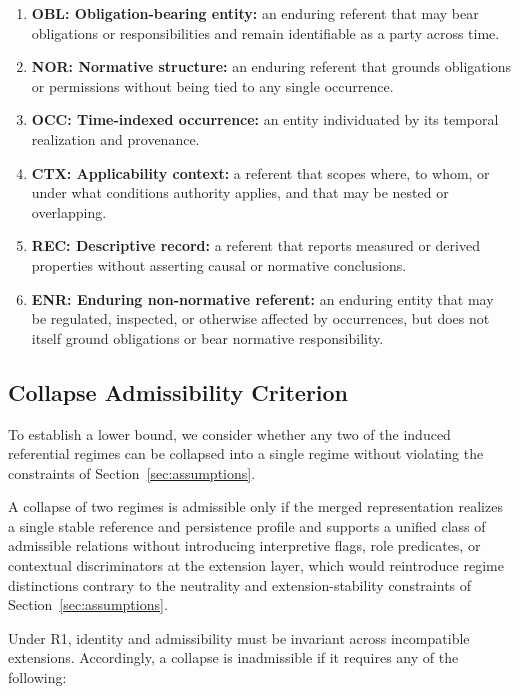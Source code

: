 \begin{enumerate}
\item \textbf{OBL: Obligation-bearing entity:} an enduring referent that may bear
      obligations or responsibilities and remain identifiable as a party across time.
\item \textbf{NOR: Normative structure:} an enduring referent that grounds
      obligations or permissions without being tied to any single occurrence.
\item \textbf{OCC: Time-indexed occurrence:} an entity individuated by its
      temporal realization and provenance.
\item \textbf{CTX: Applicability context:} a referent that scopes where, to whom,
      or under what conditions authority applies, and that may be nested or overlapping.
\item \textbf{REC: Descriptive record:} a referent that reports measured
      or derived properties without asserting causal or normative conclusions.
\item \textbf{ENR: Enduring non-normative referent:} an enduring entity
that may be regulated, inspected, or otherwise affected by occurrences,
but does not itself ground obligations or bear normative responsibility.
\end{enumerate}

\subsection{Collapse Admissibility Criterion}
\label{sec:collapse_strategy}

To establish a lower bound, we consider whether any two of the
induced referential regimes can be collapsed
into a single regime without violating the constraints of
Section~\ref{sec:assumptions}.

A collapse of two regimes is admissible only if the merged
representation realizes a single stable reference
and persistence profile and supports a unified class of admissible relations
without introducing interpretive flags, role predicates,
or contextual discriminators at the extension layer,
which would reintroduce regime distinctions contrary to
the neutrality and extension-stability constraints of
Section~\ref{sec:assumptions}.

Under R1, identity and admissibility must be invariant across
incompatible extensions.
Accordingly, a collapse is inadmissible if it requires
any of the following:

